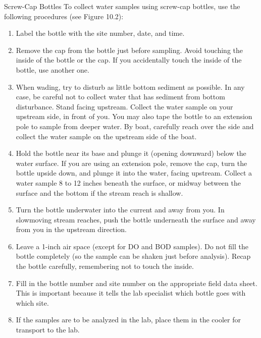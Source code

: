 \documentclass{article}
\begin{document}
Screw-Cap Bottles To collect water samples using screw-cap bottles, use
the following procedures (see Figure 10.2):

\begin{enumerate}
\def\labelenumi{\arabic{enumi}.}
\tightlist
\item
  Label the bottle with the site number, date, and time.
\item
  Remove the cap from the bottle just before sampling. Avoid touching
  the inside of the bottle or the cap. If you accidentally touch the
  inside of the bottle, use another one.
\item
  When wading, try to disturb as little bottom sediment as possible. In
  any case, be careful not to collect water that has sediment from
  bottom disturbance. Stand facing upstream. Collect the water sample on
  your upstream side, in front of you. You may also tape the bottle to
  an extension pole to sample from deeper water. By boat, carefully
  reach over the side and collect the water sample on the upstream side
  of the boat.
\item
  Hold the bottle near its base and plunge it (opening downward) below
  the water surface. If you are using an extension pole, remove the cap,
  turn the bottle upside down, and plunge it into the water, facing
  upstream. Collect a water sample 8 to 12 inches beneath the surface,
  or midway between the surface and the bottom if the stream reach is
  shallow.
\item
  Turn the bottle underwater into the current and away from you. In
  slowmoving stream reaches, push the bottle underneath the surface and
  away from you in the upstream direction.
\item
  Leave a 1-inch air space (except for DO and BOD samples). Do not fill
  the bottle completely (so the sample can be shaken just before
  analysis). Recap the bottle carefully, remembering not to touch the
  inside.
\item
  Fill in the bottle number and site number on the appropriate field
  data sheet. This is important because it tells the lab specialist
  which bottle goes with which site.
\item
  If the samples are to be analyzed in the lab, place them in the cooler
  for transport to the lab.
\end{enumerate}
\end{document}
